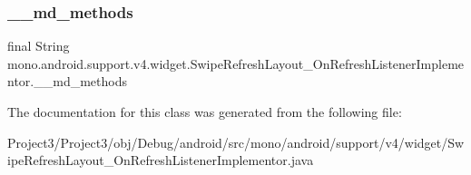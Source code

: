 \subsubsection{\texorpdfstring{\+\_\+\+\_\+md\+\_\+methods}{\_\_md\_methods}}
{\footnotesize\ttfamily final String mono.\+android.\+support.\+v4.\+widget.\+Swipe\+Refresh\+Layout\+\_\+\+On\+Refresh\+Listener\+Implementor.\+\_\+\+\_\+md\+\_\+methods\hspace{0.3cm}{\ttfamily [static]}}



The documentation for this class was generated from the following file\+:\begin{DoxyCompactItemize}
\item 
Project3/\+Project3/obj/\+Debug/android/src/mono/android/support/v4/widget/Swipe\+Refresh\+Layout\+\_\+\+On\+Refresh\+Listener\+Implementor.\+java\end{DoxyCompactItemize}
